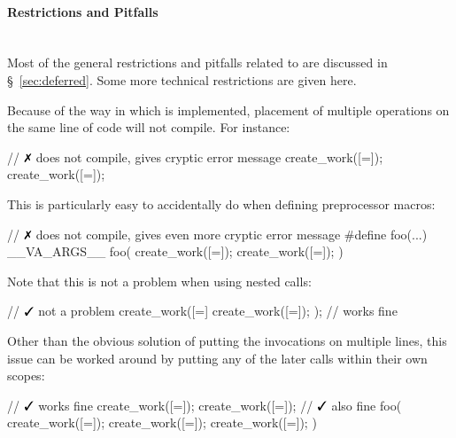 \paragraph{Restrictions and Pitfalls}\mbox{} \\
Most of the general restrictions and pitfalls related to 
are discussed in \S~\ref{sec:deferred}.  Some more technical restrictions are
given here.
\begin{compactitem}
  \item Because of the way in which  is implemented, placement of
    multiple  operations on the same line of code will not compile. 
  For instance:
  \begin{CppCode}
// $\no$ does not compile, gives cryptic error message
create_work([=]{}); create_work([=]{}); 
  \end{CppCode}
  This is particularly easy to accidentally do when defining preprocessor
  macros:
  \begin{CppCode}
// $\no$ does not compile, gives even more cryptic error message
#define foo(...) __VA_ARGS__
foo(
  create_work([=]{}); 
  create_work([=]{}); 
)
  \end{CppCode}
  Note that this is not a problem when using nested  calls:
  \begin{CppCode}
// $\yes$ not a problem
create_work([=]{ create_work([=]{}); }); // works fine
  \end{CppCode}
  Other than the obvious solution of putting the  invocations on
  multiple lines, this issue can be worked around by putting any of the later
   calls within their own scopes:
  \begin{CppCode}
// $\yes$ works fine
create_work([=]{}); { create_work([=]{}); }
// $\yes$ also fine
foo(
  create_work([=]{}); 
  { create_work([=]{}); }
  { create_work([=]{}); }
)
  \end{CppCode}
\end{compactitem}

